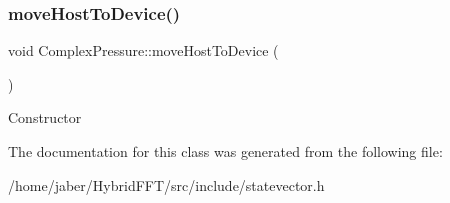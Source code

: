 \subsubsection{\texorpdfstring{move\+Host\+To\+Device()}{moveHostToDevice()}}
{\footnotesize\ttfamily void Complex\+Pressure\+::move\+Host\+To\+Device (\begin{DoxyParamCaption}{ }\end{DoxyParamCaption})}

Constructor 

The documentation for this class was generated from the following file\+:\begin{DoxyCompactItemize}
\item 
/home/jaber/\+Hybrid\+F\+F\+T/src/include/statevector.\+h\end{DoxyCompactItemize}
